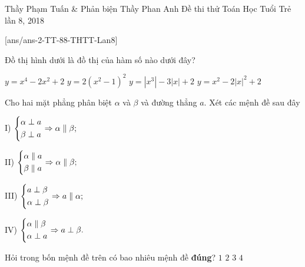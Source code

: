 \begin{name}
{Thầy Phạm Tuấn \& Phản biện Thầy Phan Anh}
{Đề thi thử Toán Học Tuổi Trẻ  lần 8, 2018}
\end{name}
\setcounter{ex}{0}
[ans/ans-2-TT-88-THTT-Lan8]

\begin{ex}%
Đồ thị hình dưới là đồ thị của hàm số nào dưới đây?
\begin{center}
\end{center}
\choice
{$y=x^4-2x^2+2$}
{$y=2(x^2-1)^2$}
{\True $y=\left |x^3\right |-3|x|+2$}
{$y=x^2-2|x|^2+2$}
\end{ex}

\begin{ex}%
Cho hai mặt phẳng phân biệt $\alpha$ và $\beta$ và đường thẳng $a$. Xét các mệnh đề sau đây 
\begin{multicols}{2}
\item I) $\left\{\begin{aligned}&\alpha \perp a\\ &\beta \perp a\end{aligned}\right. \Rightarrow \alpha \parallel \beta;$
\item II) $\left\{\begin{aligned}&\alpha \parallel a \\&\beta \parallel a\end{aligned}\right. \Rightarrow \alpha \parallel \beta;$
\item III) $\left\{\begin{aligned}&a\perp \beta\\ &\alpha \perp \beta\end{aligned}\right. \Rightarrow a\parallel \alpha;$
\item IV) $\left\{\begin{aligned}&\alpha \parallel \beta\\ &\alpha \perp a\end{aligned}\right. \Rightarrow a\perp \beta.$
\end{multicols}
\noindent
Hỏi trong bốn mệnh đề trên có bao nhiêu mệnh đề \textbf{đúng}?
\choice
{$1$}
{\True $2$}
{$3$}
{$4$}
\end{ex}

